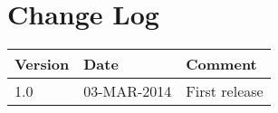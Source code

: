 \documentclass[Main]{subfiles}
\begin{document}
\section*{Change Log}

\begin{table}[H]

\begin{tabular}{p{} p{} p{}}
\hline
\textbf{Version} & \textbf{Date} & \textbf{Comment} \\\hline
1.0 & 03-MAR-2014 & First release\\
\hline
\end{tabular}

\end{table}
\end{document}
